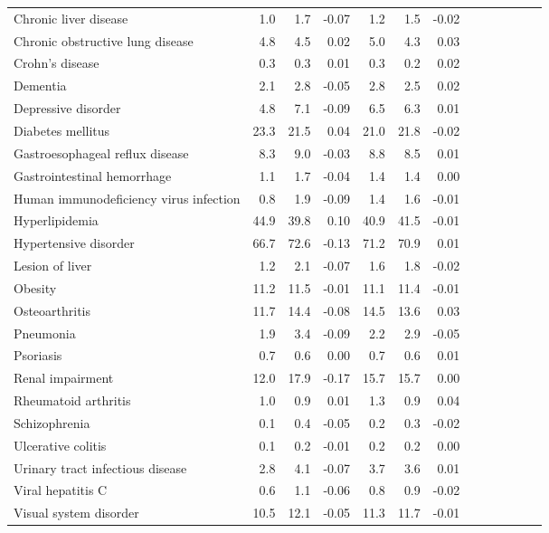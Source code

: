 \documentclass[11pt,]{article}
\begin{document}
\begin{longtable}{lrrrrrrrrrrrr}
      Chronic liver disease &  1.0 &  1.7 & -0.07 &  1.2 &  1.5 & -0.02 \\ 
      Chronic obstructive lung disease &  4.8 &  4.5 &  0.02 &  5.0 &  4.3 &  0.03 \\ 
      Crohn's disease &  0.3 &  0.3 &  0.01 &  0.3 &  0.2 &  0.02 \\ 
      Dementia &  2.1 &  2.8 & -0.05 &  2.8 &  2.5 &  0.02 \\ 
      Depressive disorder &  4.8 &  7.1 & -0.09 &  6.5 &  6.3 &  0.01 \\ 
      Diabetes mellitus & 23.3 & 21.5 &  0.04 & 21.0 & 21.8 & -0.02 \\ 
      Gastroesophageal reflux disease &  8.3 &  9.0 & -0.03 &  8.8 &  8.5 &  0.01 \\ 
      Gastrointestinal hemorrhage &  1.1 &  1.7 & -0.04 &  1.4 &  1.4 &  0.00 \\ 
      Human immunodeficiency virus infection &  0.8 &  1.9 & -0.09 &  1.4 &  1.6 & -0.01 \\ 
      Hyperlipidemia & 44.9 & 39.8 &  0.10 & 40.9 & 41.5 & -0.01 \\ 
      Hypertensive disorder & 66.7 & 72.6 & -0.13 & 71.2 & 70.9 &  0.01 \\ 
      Lesion of liver &  1.2 &  2.1 & -0.07 &  1.6 &  1.8 & -0.02 \\ 
      Obesity & 11.2 & 11.5 & -0.01 & 11.1 & 11.4 & -0.01 \\ 
      Osteoarthritis & 11.7 & 14.4 & -0.08 & 14.5 & 13.6 &  0.03 \\ 
      Pneumonia &  1.9 &  3.4 & -0.09 &  2.2 &  2.9 & -0.05 \\ 
      Psoriasis &  0.7 &  0.6 &  0.00 &  0.7 &  0.6 &  0.01 \\ 
      Renal impairment & 12.0 & 17.9 & -0.17 & 15.7 & 15.7 &  0.00 \\ 
      Rheumatoid arthritis &  1.0 &  0.9 &  0.01 &  1.3 &  0.9 &  0.04 \\ 
      Schizophrenia &  0.1 &  0.4 & -0.05 &  0.2 &  0.3 & -0.02 \\ 
      Ulcerative colitis &  0.1 &  0.2 & -0.01 &  0.2 &  0.2 &  0.00 \\ 
      Urinary tract infectious disease &  2.8 &  4.1 & -0.07 &  3.7 &  3.6 &  0.01 \\ 
      Viral hepatitis C &  0.6 &  1.1 & -0.06 &  0.8 &  0.9 & -0.02 \\ 
      Visual system disorder & 10.5 & 12.1 & -0.05 & 11.3 & 11.7 & -0.01 \\ 

\end{longtable}
\end{document}
